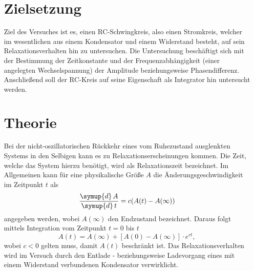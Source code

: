 \section{Zielsetzung}
Ziel des Versuches ist es, einen RC-Schwingkreis, also einen Stromkreis, welcher im wesentlichen aus einem Kondensator und einem Widerstand 
besteht, auf sein Relaxationsverhalten hin zu untersuchen. Die Untersuchung beschäftigt sich mit der Bestimmung der Zeitkonstante
und der Frequenzabhängigkeit (einer angelegten Wechselspannung) der Amplitude beziehungsweise Phasendifferenz. Anschließend soll der
RC-Kreis auf seine Eigenschaft als Integrator hin untersucht werden.

\section{Theorie}
\label{sec:Theorie}

Bei der nicht-oszillatorischen Rückkehr eines vom 
Ruhezustand ausglenkten Systems in den Selbigen
kann es zu Relaxationserscheinungen kommen. Die Zeit,
welche das System hierzu benötigt, wird als 
Relaxationszeit bezeichnet. Im Allgemeinen kann 
für eine physikalische Größe $A$ die Änderungsgeschwindigkeit
im Zeitpunkt $t$ als 
\begin{equation}
\label{eqn:aenderungsgeschwindigkeit}
\frac{\symup{d} \, A} {\symup{d} \, t} = c (A(t) - A(\infty))
\end{equation}
angegeben werden, wobei $A(\infty)$ den Endzustand bezeichnet. 
Daraus folgt mittels Integration vom Zeitpunkt $t = 0$ bis $t$
\begin{equation}
\label{eqn:A}
A(t) = A(\infty) + [ A(0) - A(\infty)] \cdot e^{ct},
\end{equation}
wobei $c < 0$ gelten muss, damit $A(t)$ beschränkt ist.
Das Relaxationsverhalten wird im Versuch durch den 
Entlade - beziehungsweise Ladevorgang eines mit einem 
Widerstand verbundenen Kondensator verwirklicht.

